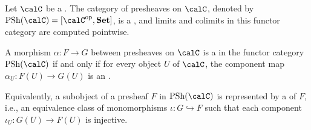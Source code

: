 \begin{proposition} \label{proposition:subobjects_of_presheaf_category_are_pointwise_injective}
Let $\calC$ be a . The category of presheaves on $\calC$, denoted by $\operatorname{PSh}(\calC) = [\calC^{\operatorname{op}}, \mathbf{Set}]$, is a , and limits and colimits in this functor category are computed pointwise.

A morphism $\alpha: F \to G$ between presheaves on $\calC$ is a  in the functor category $\operatorname{PSh}(\calC)$ if and only if for every object $U$ of $\calC$, the component map $\alpha_U: F(U) \to G(U)$ is an .

Equivalently, a subobject of a presheaf $F$ in $\operatorname{PSh}(\calC)$ is represented by a  of $F$, i.e., an equivalence class of monomorphisms $\iota: G \hookrightarrow F$ such that each component $\iota_U: G(U) \to F(U)$ is injective.

\end{proposition}